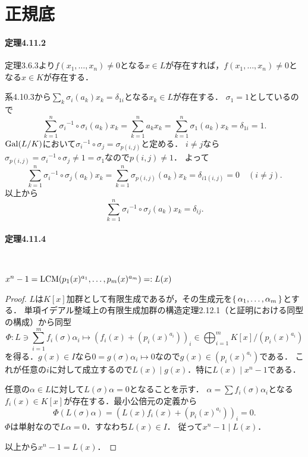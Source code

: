 \documentclass[a4paper]{ltjsreport}
\begin{document}
\setcounter{section}{10}
\section{正規底}
\paragraph{定理4.11.2}
定理3.6.3より\(f(x_1, \ldots, x_n) \neq 0\)となる\(x\in L\)が存在すれば，\(f(x_1, \ldots, x_n) \neq 0\)となる\(x\in K\)が存在する．

系4.10.3から\(\sum_k \sigma_i(a_k)x_k=\delta_{1i}\)となる\(x_k \in L\)が存在する．
\(\sigma_1 = 1\)としているので
\[ \sum_{k=1}^n \sigma_i{}^{-1} \circ \sigma_i(a_k) x_k = \sum_{k=1}^n a_k x_k = \sum_{k=1}^n \sigma_1(a_k)x_k = \delta_{1i} = 1 . \]
\(\operatorname{Gal}(L/K)\)において\(\sigma_i{}^{-1} \circ \sigma_j = \sigma_{p(i,j)}\)と定める．
\(i\neq j\)なら\(\sigma_{p(i,j)} = \sigma_i{}^{-1} \circ \sigma_j \neq 1 = \sigma_1\)なので\(p(i,j) \neq 1\)．
よって
\[ \sum_{k=1}^n \sigma_i{}^{-1} \circ \sigma_j(a_k) x_k = \sum_{k=1}^n \sigma_{p(i,j)}(a_k)x_k = \delta_{i1(i,j)} = 0 \quad (i\neq j) . \]
以上から
\[ \sum_{k=1}^n \sigma_i{}^{-1} \circ \sigma_j(a_k) x_k = \delta_{ij} . \]

\paragraph{定理4.11.4}~
\begin{screen}
  \(x^n-1 = \operatorname{LCM}(p_1(x)^{a_1}, \ldots, p_m(x)^{a_m}) =: L(x)\)
\end{screen}
\begin{proof}
  \(L\)は\(K[x]\)加群として有限生成であるが，その生成元を\(\set{\alpha_1, \ldots, \alpha_m}\)とする．
  単項イデアル整域上の有限生成加群の構造定理2.12.1（と証明における同型の構成）から同型
  \[
  \Phi\colon L \ni \sum_{i=1}^m f_i(\sigma) \alpha_i \mapsto (f_i(x)+(p_i(x)^{a_i}))_i \in \bigoplus_{i=1}^m K[x] / (p_i(x)^{a_i})
  \]
  を得る．\(g(x) \in I\)なら\(0 = g(\sigma) \alpha_i \mapsto 0\)なので\(g(x) \in (p_i(x)^{a_i})\)である．
  これが任意の\(i\)に対して成立するので\(L(x) \mid g(x)\)．特に\(L(x) \mid x^n-1\)である．

  任意の\(\alpha \in L\)に対して\(L(\sigma)\alpha=0\)となることを示す．
  \(\alpha = \sum f_i(\sigma) \alpha_i\)となる\(f_i(x) \in K[x]\)が存在する．最小公倍元の定義から
  \[ \Phi(L(\sigma)\alpha) = (L(x)f_i(x)+(p_i(x)^{a_i}))_i = 0 . \]
  \(\Phi\)は単射なので\(L\alpha = 0\)．すなわち\(L(x) \in I\)．
  従って\(x^n-1 \mid L(x)\)．

  以上から\(x^n-1 = L(x)\)．
\end{proof}
\end{document}

